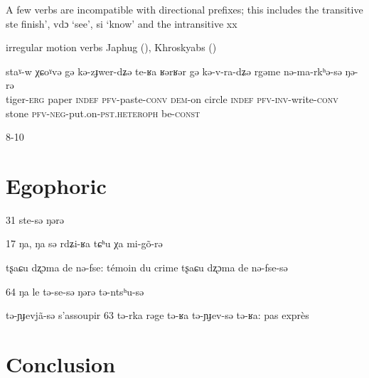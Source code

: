 \documentclass[oldfontcommands,oneside,a4paper,11pt]{article}
\newcommand{\ipa}[1]{{\phon #1}} %
\begin{document}
A few verbs are incompatible with directional prefixes; this includes the transitive \ipa{ste}  finish', \ipa{vdɔ} `see', \ipa{si} `know' and the intransitive \ipa{xx}

irregular motion verbs
Japhug (\citealt{jacques12incorp}), Khroskyabs (\citealt{lai13affixale})
\begin{exe}
\ex
\gll
\ipa{staˠ-w} 	\ipa{χɕoˠvə} 	\ipa{gə} 	\ipa{kə-zɟwer-dʑə} 	\ipa{te-ʁa} 	\ipa{ʁərʁər} 	\ipa{gə} 	\ipa{kə-v-ra-dʑə} 	\ipa{rgəme} 	\ipa{nə-ma-rkʰə-sə} 	\ipa{ŋə-rə} \\
tiger-\textsc{erg} paper \textsc{indef} \textsc{pfv}-paste-\textsc{conv} \textsc{dem}-on circle \textsc{indef} \textsc{pfv-inv}-write-\textsc{conv} stone \textsc{pfv-neg}-put.on-\textsc{pst.heteroph} be-\textsc{const} \\
\glt
\end{exe}
8-10

\section{Egophoric}

31 ste-sə ŋərə

17	ŋa, ŋa sə rdʑi-ʁa tɕʰu χa mi-gõ-rə

tʂaɕu dʐɔma de nə-fse: témoin du crime
tʂaɕu dʐɔma de nə-fse-sə

64	ŋa le tə-se-sə ŋərə tə-ntsʰu-sə

tə-ɲɟevjã-sə
s'assoupir
63	tə-rka rəge tə-ʁa tə-ɲɟev-sə
		tə-ʁa: pas exprès

\section{Conclusion}



%









\end{document}
